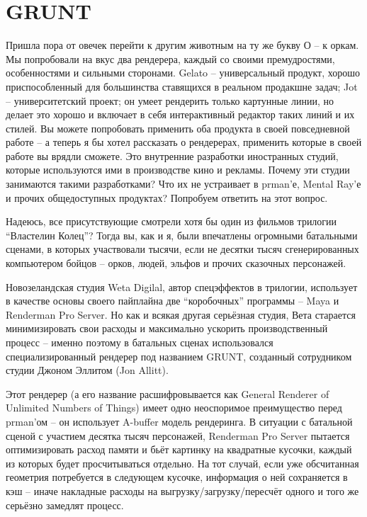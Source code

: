  
\chapter*{GRUNT}
  

 Пришла пора от овечек перейти к другим животным на
    ту же букву О – к оркам. Мы попробовали на вкус два рендерера,
    каждый со своими премудростями, особенностями и сильными сторонами.
    Gelato – универсальный продукт, хорошо приспособленный для
    большинства ставящихся в реальном продакшне задач; Jot –
    университетский проект; он умеет рендерить только картунные линии,
    но делает это хорошо и включает в себя интерактивный редактор таких
    линий и их стилей. Вы можете попробовать применить оба продукта в
    своей повседневной работе – а теперь я бы хотел рассказать о
    рендерерах, применить которые в своей работе вы врядли сможете. Это
    внутренние разработки иностранных студий, которые используются ими
    в производстве кино и рекламы. Почему эти студии занимаются такими
    разработками? Что их не устраивает в prman’е, Mental Ray’е и прочих
    общедоступных продуктах? Попробуем ответить на этот
    вопрос.
  

 Надеюсь, все присутствующие смотрели хотя бы один
    из фильмов трилогии “Властелин Колец”? Тогда вы, как и я, были
    впечатлены огромными батальными сценами, в которых участвовали
    тысячи, если не десятки тысяч сгенерированных компьютером бойцов –
    орков, людей, эльфов и прочих сказочных персонажей.
  

 Новозеландская студия Weta Digilal, автор
    спецэффектов в трилогии, использует в качестве основы своего
    пайплайна две “коробочных” программы – Maya и Renderman Pro Server.
    Но как и всякая другая серьёзная студия, Вета старается
    минимизировать свои расходы и максимально ускорить производственный
    процесс – именно поэтому в батальных сценах использовался
    специализированный рендерер под названием GRUNT, созданный
    сотрудником студии Джоном Эллитом (Jon Allitt).
  

 Этот рендерер (а его название расшифровывается как
    General Renderer of Unlimited Numbers of Things) имеет одно
    неоспоримое преимущество перед prman’ом – он использует A-buffer
    модель рендеринга. В ситуации с батальной сценой с участием десятка
    тысяч персонажей, Renderman Pro Server пытается оптимизировать
    расход памяти и бьёт картинку на квадратные кусочки, каждый из
    которых будет просчитываться отдельно. На тот случай, если уже
    обсчитанная геометрия потребуется в следующем кусочке, информация о
    ней сохраняется в кэш – иначе накладные расходы на
    выгрузку/загрузку/пересчёт одного и того же серьёзно замедлят
    процесс.
  

